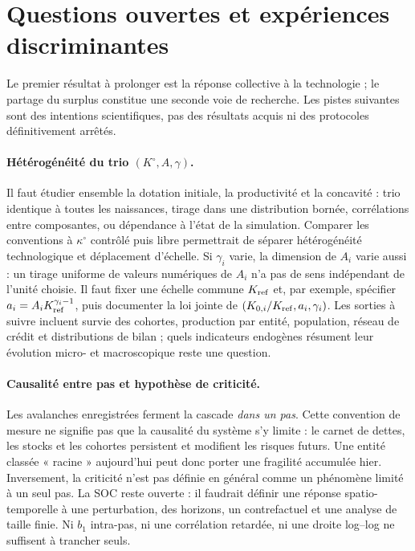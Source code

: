 \section{Questions ouvertes et expériences discriminantes}
\label{sec:perspectives}
Le premier résultat à prolonger est la réponse collective à la technologie ;
le partage du surplus constitue une seconde voie de recherche. Les pistes
suivantes sont des intentions scientifiques, pas des résultats acquis ni
des protocoles définitivement arrêtés.

\paragraph{Hétérogénéité du trio $(K^\circ,A,\gamma)$.}
Il faut étudier ensemble la dotation initiale, la productivité et la concavité :
trio identique à toutes les naissances, tirage dans une distribution bornée,
corrélations entre composantes, ou dépendance à l'état de la simulation.
Comparer les conventions à $\kappa^\circ$ contrôlé puis libre permettrait de séparer
hétérogénéité technologique et déplacement d'échelle. Si $\gamma_i$ varie,
la dimension de $A_i$ varie aussi : un tirage uniforme de valeurs numériques
de $A_i$ n'a pas de sens indépendant de l'unité choisie. Il faut fixer une
échelle commune $K_{\rm ref}$ et, par exemple, spécifier
$a_i=A_i K_{\rm ref}^{\gamma_i-1}$, puis documenter la loi jointe de
$(K_{0,i}/K_{\rm ref},a_i,\gamma_i)$.
Les sorties à suivre incluent survie des cohortes, production par entité,
population, réseau de crédit et distributions de bilan ; quels indicateurs
endogènes résument leur évolution micro- et macroscopique reste une question.

\paragraph{Causalité entre pas et hypothèse de criticité.}
Les avalanches enregistrées ferment la cascade \emph{dans un pas}.
Cette convention de mesure ne signifie pas que la causalité du système
s'y limite : le carnet de dettes, les stocks et les cohortes persistent et
modifient les risques futurs. Une entité classée « racine » aujourd'hui peut
donc porter une fragilité accumulée hier. Inversement, la criticité n'est pas
définie en général comme un phénomène limité à un seul pas.
La SOC reste ouverte : il faudrait définir une réponse spatio-temporelle à
une perturbation, des horizons, un contrefactuel et une analyse de taille finie.
Ni $b_1$ intra-pas, ni une corrélation retardée, ni une droite log--log ne
suffisent à trancher seuls.

